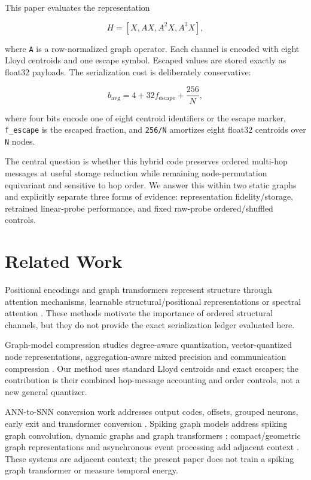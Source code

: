 \documentclass{article}
\begin{document}
This paper evaluates the representation

\[
H = [X, AX, A^2X, A^3X],
\]

where \texttt{A} is a row-normalized graph operator. Each channel is encoded with eight Lloyd centroids and one escape symbol. Escaped values are stored exactly as float32 payloads. The serialization cost is deliberately conservative:

\[
b_{\mathrm{avg}} = 4 + 32 f_{\mathrm{escape}} + \frac{256}{N},
\]

where four bits encode one of eight centroid identifiers or the escape marker, \texttt{f\_escape} is the escaped fraction, and \texttt{256/N} amortizes eight float32 centroids over \texttt{N} nodes.

The central question is whether this hybrid code preserves ordered multi-hop messages at useful storage reduction while remaining node-permutation equivariant and sensitive to hop order. We answer this within two static graphs and explicitly separate three forms of evidence: representation fidelity/storage, retrained linear-probe performance, and fixed raw-probe ordered/shuffled controls.

\section{Related Work}

\label{sec:related_work}

Positional encodings and graph transformers represent structure through attention mechanisms, learnable structural/positional representations or spectral attention \cite{vaswani2017attention,dwivedi2021graph,kreuzer2021rethinking}. These methods motivate the importance of ordered structural channels, but they do not provide the exact serialization ledger evaluated here.

Graph-model compression studies degree-aware quantization, vector-quantized node representations, aggregation-aware mixed precision and communication compression \cite{tailor2021degreequant,ding2021vqgnn,wang2022qgtc,zhu2023a2q,wan2023adaqp,gholami2022quantization,jacob2018quantization,nagel2021white}. Our method uses standard Lloyd centroids and exact escapes; the contribution is their combined hop-message accounting and order controls, not a new general quantizer.

ANN-to-SNN conversion work addresses output codes, offsets, grouped neurons, early exit and transformer conversion \cite{one-spike,hao2023offset,lv2024group,bu2023optimal,li2023seenn,hu2023fast,zhao2025ttfs,huang2025ecmt,li2024erroraware}. Spiking graph models address spiking graph convolution, dynamic graphs and graph transformers \cite{spikinggcn,spikenet,dy-sign,delay-dsgn,signnn,sun2024spikegraphormer,zhang2025sgnnbench}; compact/geometric graph representations and asynchronous event processing add adjacent context \cite{li2023graph1bit,chaurasia2026sgspose,asgcn}. These systems are adjacent context; the present paper does not train a spiking graph transformer or measure temporal energy.
\end{document}
